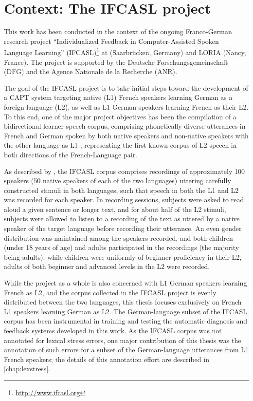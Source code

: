 \section{Context: The IFCASL project}
\label{sec:intro:ifcasl}

This work has been conducted in the context of the ongoing Franco-German research project ``Individualized Feedback in Computer-Assisted Spoken Language Learning'' (IFCASL)\footnote{\url{http://www.ifcasl.org}} at 
\thesisUniversity
(Saarbrücken, Germany) and LORIA (Nancy, France). 
The project is supported by the Deutsche Forschungsgemeinschaft (DFG) and the Agence Nationale de la Recherche (ANR).

The goal of the IFCASL project is to take initial steps toward the development of a CAPT system targeting
native (L1) French speakers learning German as a foreign language (L2), 
as well as
L1 German speakers learning French as their L2. To this end, one of the major project objectives has been the compilation of a bidirectional learner speech corpus, comprising phonetically diverse utterances in French and German spoken by both native speakers and non-native speakers with the other language as L1 \citep{Fauth2014,Trouvain2013}, representing the first known corpus of L2 speech in both directions of the French-Language pair.

As described by \textcite{Trouvain2013,Fauth2014}, the IFCASL corpus comprises recordings of approximately 100 speakers (50 native speakers of each of the two languages) uttering carefully constructed stimuli in both languages, such that speech in both the L1 and L2 was recorded for each speaker. In recording sessions, subjects were asked to read aloud a given sentence or longer text, and for about half of the L2 stimuli, subjects were allowed to listen to a recording of the text as uttered by a native speaker of the target language before recording their utterance. An even gender distribution was maintained among the speakers recorded, and both children (under 18 years of age) and adults participated in the recordings (the majority being adults); while children were uniformly of beginner proficiency in their L2, adults of both beginner and advanced levels in the L2 were recorded. 

While the project as a whole is also concerned with L1 German speakers learning French as L2, and the corpus collected in the IFCASL project is evenly distributed between the two languages, this thesis focuses exclusively on French L1 speakers learning German as L2. 
The German-language subset of the IFCASL corpus has been instrumental in training and testing the automatic diagnosis and feedback systems developed in this work. As the IFCASL corpus was not annotated for lexical stress errors, one major contribution of this thesis was the annotation of such errors for a subset of the German-language utterances from L1 French speakers; the details of this annotation effort are described in \cref{chap:lexstress}. 

